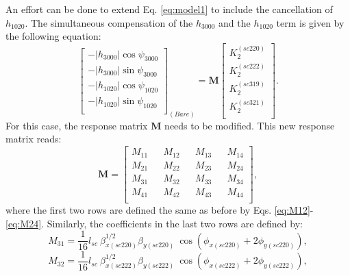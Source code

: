 An effort can be done to extend Eq. \ref{eq:model1} to include the cancellation of $h_{1020}$. The simultaneous compensation of the $h_{3000}$ and the $h_{1020}$ term is given by the following equation:
\begin{equation}
    \begin{bmatrix}
        -|h_{3000}| \cos \psi_{3000} \\
        -|h_{3000}| \sin \psi_{3000} \\
        -|h_{1020}| \cos \psi_{1020} \\
        -|h_{1020}| \sin \psi_{1020} \\
        \end{bmatrix}_{(Bare)}
         =
        \boldsymbol{M}
        \begin{bmatrix}
        K_2^{(sc220)} \\
        K_2^{(sc222)}\\
        K_2^{(sc319)} \\
        K_2^{(sc321)}\\
        \end{bmatrix}.
        \label{eq:model2}
\end{equation}
For this case, the response matrix $\boldsymbol{M}$ needs to be modified. This new response matrix reads:
\begin{equation}
    \boldsymbol{M} = 
\begin{bmatrix}

M_{11} && M_{12} && M_{13} && M_{14}  \\ 

M_{21} && M_{22} && M_{23} && M_{24} \\ 

M_{31} && M_{32} && M_{33} && M_{34}  \\ 

M_{41} && M_{42} && M_{43} && M_{44} \\ 

\end{bmatrix},
\label{eq:rm2}
\end{equation}
where the first two rows are defined the same as before by Eqs. \ref{eq:M12}-\ref{eq:M24}. Similarly, the coefficients in the last two rows are defined by:
\begin{equation}
    M_{31}=\frac{1}{16} l_{sc} \: \beta^{1/2}_{x(sc220)} \beta_{y(sc220)} \: \cos \left( \phi_{x(sc220)} + 2\phi_{y(sc220)} \right),
    \label{eq:M31}
\end{equation}
\begin{equation}
    M_{32}=\frac{1}{16} l_{sc} \: \beta^{1/2}_{x(sc222)} \beta_{y(sc222)} \: \cos \left( \phi_{x(sc222)} + 2\phi_{y(sc222)} \right),
    \label{eq:M32}
\end{equation}
